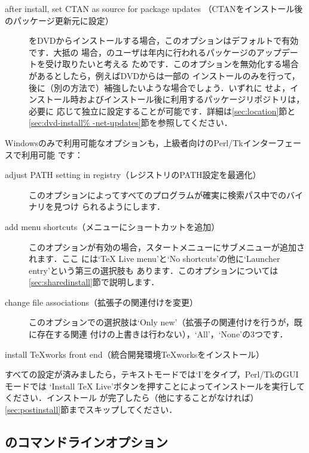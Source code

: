 \documentclass[uplatex,dvipdfmx,tombow]{jsarticle}
\begin{document}
\begin{description}
\item[after install, set CTAN as source for package updates%
（CTANをインストール後のパッケージ更新元に設定）]
\TL をDVDからインストールする場合，このオプションはデフォルトで有効です．大抵の
場合，\TL のユーザは年内に行われるパッケージのアップデートを受け取りたいと考える
ためです．このオプションを無効化する場合があるとしたら，例えばDVDからは一部の
インストールのみを行って，後に（別の方法で）補強したいような場合でしょう．いずれに
せよ，インストール時およびインストール後に利用するパッケージリポジトリは，必要に
応じて独立に設定することが可能です．詳細は\ref{sec:location}節と\ref{sec:dvd-install%
-net-updates}節を参照してください．
\end{description}

Windowsのみで利用可能なオプションも，上級者向けのPerl/Tkインターフェースで利用可能
です：
%
\begin{description}
\item[adjust PATH setting in registry（レジストリのPATH設定を最適化）]
このオプションによってすべてのプログラムが確実に検索パス中で\TL のバイナリを見つけ
られるようにします．

\item[add menu shortcuts（メニューにショートカットを追加）]
このオプションが有効の場合，スタートメニューに\TL サブメニューが追加されます．ここ
には`TeX Live menu'と`No shortcuts'の他に`Launcher entry'という第三の選択肢も
あります．このオプションについては\ref{sec:sharedinstall}節で説明します．

\item[change file associations（拡張子の関連付けを変更）]
このオプションでの選択肢は`Only new'（拡張子の関連付けを行うが，既に存在する関連
付けの上書きは行わない），`All'，`None'の3つです．

\item[install \TeX works front end（統合開発環境\TeX worksをインストール）]
\end{description}

すべての設定が済みましたら，テキストモードでは`I'をタイプ，Perl/TkのGUIモードでは
`Install TeX Live'ボタンを押すことによってインストールを実行してください．インストール
が完了したら（他にすることがなければ）\ref{sec:postinstall}節までスキップしてください．

\subsection{のコマンドラインオプション}
\label{sec:cmdline}
\end{document}
